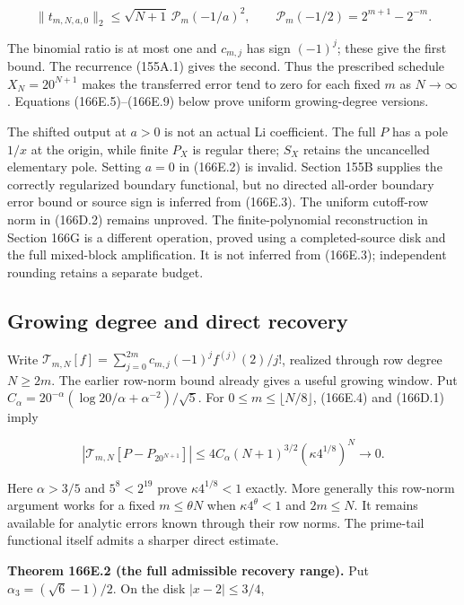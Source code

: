 \documentclass[
  11pt,
]{book}
\begin{document}
\[
\|t_{m,N,a,0}\|_2\le\sqrt{N+1}\,\mathcal P_m(-1/a)^2,
\qquad\mathcal P_m(-1/2)=2^{m+1}-2^{-m}.
\tag{166E.4}
\]

The binomial ratio is at most one and \(c_{m,j}\) has sign \((-1)^j\);
these give the first bound. The recurrence (155A.1) gives the second.
Thus the prescribed schedule \(X_N=20^{N+1}\) makes the transferred
error tend to zero for each fixed \(m\) as \(N\to\infty\). Equations
(166E.5)--(166E.9) below prove uniform growing-degree versions.

The shifted output at \(a>0\) is not an actual Li coefficient. The full
\(P\) has a pole \(1/x\) at the origin, while finite \(P_X\) is regular
there; \(S_X\) retains the uncancelled elementary pole. Setting \(a=0\)
in (166E.2) is invalid. Section 155B supplies the correctly regularized
boundary functional, but no directed all-order boundary error bound or
source sign is inferred from (166E.3). The uniform cutoff-row norm in
(166D.2) remains unproved. The finite-polynomial reconstruction in
Section 166G is a different operation, proved using a completed-source
disk and the full mixed-block amplification. It is not inferred from
(166E.3); independent rounding retains a separate budget.

\subsection{Growing degree and direct
recovery}\label{growing-degree-and-direct-recovery}

Write \(\mathcal T_{m,N}[f]=\sum_{j=0}^{2m}c_{m,j}(-1)^jf^{(j)}(2)/j!\),
realized through row degree \(N\ge2m\). The earlier row-norm bound
already gives a useful growing window. Put
\(C_\alpha=20^{-\alpha}(\log20/\alpha+\alpha^{-2})/\sqrt5\). For
\(0\le m\le\lfloor N/8\rfloor\), (166E.4) and (166D.1) imply

\[
|\mathcal T_{m,N}[P-P_{20^{N+1}}]|
\le4C_\alpha(N+1)^{3/2}(\kappa4^{1/8})^N\longrightarrow0.
\tag{166E.5}
\]

Here \(\alpha>3/5\) and \(5^8<2^{19}\) prove \(\kappa4^{1/8}<1\)
exactly. More generally this row-norm argument works for a fixed
\(m\le\theta N\) when \(\kappa4^\theta<1\) and \(2m\le N\). It remains
available for analytic errors known through their row norms. The
prime-tail functional itself admits a sharper direct estimate.

\textbf{Theorem 166E.2 (the full admissible recovery range).} Put
\(\alpha_3=(\sqrt6-1)/2\). On the disk \(|x-2|\le3/4\),
\end{document}
